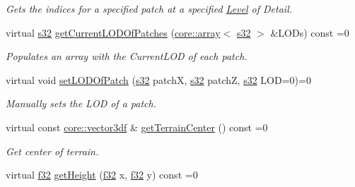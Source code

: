 \begin{DoxyCompactItemize}
\begin{DoxyCompactList}\small\item\em Gets the indices for a specified patch at a specified \hyperlink{classLevel}{Level} of Detail. \end{DoxyCompactList}\item 
virtual \hyperlink{namespaceirr_ac66849b7a6ed16e30ebede579f9b47c6}{s32} \hyperlink{classirr_1_1scene_1_1ITerrainSceneNode_a0d310851f0ebf1fce18d3a2c0f3dceab}{get\+Current\+L\+O\+D\+Of\+Patches} (\hyperlink{classirr_1_1core_1_1array}{core\+::array}$<$ \hyperlink{namespaceirr_ac66849b7a6ed16e30ebede579f9b47c6}{s32} $>$ \&L\+O\+Ds) const =0
\begin{DoxyCompactList}\small\item\em Populates an array with the Current\+L\+OD of each patch. \end{DoxyCompactList}\item 
virtual void \hyperlink{classirr_1_1scene_1_1ITerrainSceneNode_a41b7f1ee70511d648cc11217347160ad}{set\+L\+O\+D\+Of\+Patch} (\hyperlink{namespaceirr_ac66849b7a6ed16e30ebede579f9b47c6}{s32} patchX, \hyperlink{namespaceirr_ac66849b7a6ed16e30ebede579f9b47c6}{s32} patchZ, \hyperlink{namespaceirr_ac66849b7a6ed16e30ebede579f9b47c6}{s32} L\+OD=0)=0
\begin{DoxyCompactList}\small\item\em Manually sets the L\+OD of a patch. \end{DoxyCompactList}\item 
\mbox{\label{classirr_1_1scene_1_1ITerrainSceneNode_a804241f60c853e74fcb8687cd887f1b7}} 
virtual const \hyperlink{namespaceirr_1_1core_ae6e2b2a6c552833ebbd5b7463d03586b}{core\+::vector3df} \& \hyperlink{classirr_1_1scene_1_1ITerrainSceneNode_a804241f60c853e74fcb8687cd887f1b7}{get\+Terrain\+Center} () const =0
\begin{DoxyCompactList}\small\item\em Get center of terrain. \end{DoxyCompactList}\item 
\mbox{\label{classirr_1_1scene_1_1ITerrainSceneNode_a9289839822ea77496af62f311f01c8bb}} 
virtual \hyperlink{namespaceirr_a0277be98d67dc26ff93b1a6a1d086b07}{f32} \hyperlink{classirr_1_1scene_1_1ITerrainSceneNode_a9289839822ea77496af62f311f01c8bb}{get\+Height} (\hyperlink{namespaceirr_a0277be98d67dc26ff93b1a6a1d086b07}{f32} x, \hyperlink{namespaceirr_a0277be98d67dc26ff93b1a6a1d086b07}{f32} y) const =0

\end{DoxyCompactItemize}
